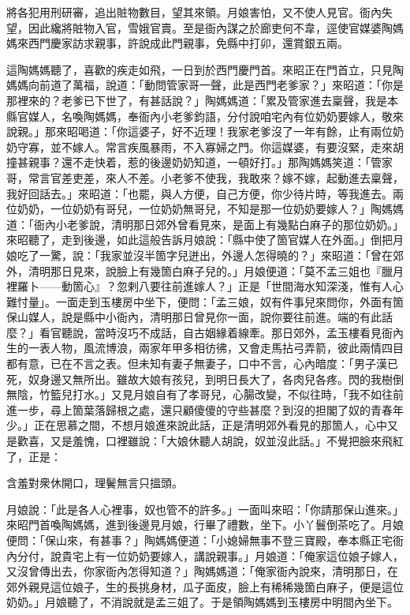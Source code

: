 將各犯用刑研審，追出賍物數目，望其來領。{}月娘害怕，又不使人見官。衙內失望，因此纔將賍物入官，雪娥官賣。至是衙內謀之於廊吏何不韋，逕使官媒婆陶媽媽來西門慶家訪求親事，許說成此門親事，免縣中打卯，還賞銀五兩。

這陶媽媽聽了，喜歡的疾走如飛，一日到於西門慶門首。來昭正在門首立，只見陶媽媽向前道了萬福，說道：「動問管家哥一聲，此是西門老爹家？」來昭道：「你是那裡來的？老爹已下世了，有甚話說？」陶媽媽道：「累及管家進去稟聲，我是本縣官媒人，名喚陶媽媽，奉衙內小老爹鈞語，分付說咱宅內有位奶奶要嫁人，敬來說親。」那來昭喝道：「你這婆子，好不近理！我家老爹沒了一年有餘，止有兩位奶奶守寡，並不嫁人。常言疾風暴雨，不入寡婦之門。你這媒婆，有要沒緊，走來胡撞甚親事？還不走快着，惹的後邊奶奶知道，一頓好打。」那陶媽媽笑道：「管家哥，常言官差吏差，來人不差。小老爹不使我，我敢來？嫁不嫁，起動進去稟聲，我好回話去。」來昭道：「也罷，與人方便，自己方便，你少待片時，等我進去。兩位奶奶，一位奶奶有哥兒，一位奶奶無哥兒，不知是那一位奶奶要嫁人？」陶媽媽道：「衙內小老爹說，清明那日郊外曾看見來，是面上有幾點白麻子的那位奶奶。」來昭聽了，走到後邊，如此這般告訴月娘說：「縣中使了箇官媒人在外面。」倒把月娘吃了一驚，說：「我家並沒半箇字兒迸出，外邊人怎得曉的？」來昭道：「曾在郊外，清明那日見來，說臉上有幾箇白麻子兒的。」月娘便道：「莫不孟三姐也『臘月裡羅卜——動箇心』？忽剌八要往前進嫁人？」正是「世間海水知深淺，惟有人心難忖量」。一面走到玉樓房中坐下，便問：「孟三娘，奴有件事兒來問你，外面有箇保山媒人，說是縣中小衙內，清明那日曾見你一面，說你要往前進。端的有此話麼？」{}看官聽說，當時沒巧不成話，自古姻緣着線牽。那日郊外，孟玉樓看見衙內生的一表人物，風流博浪，兩家年甲多相彷彿，又會走馬拈弓弄箭，彼此兩情四目都有意，已在不言之表。但未知有妻子無妻子，口中不言，心內暗度：「男子漢已死，奴身邊又無所出。雖故大娘有孩兒，到明日長大了，各肉兒各疼。閃的我樹倒無陰，竹籃兒打水。」又見月娘自有了孝哥兒，心腸改變，不似往時，「我不如往前進一步，尋上箇葉落歸根之處，還只顧傻傻的守些甚麼？到沒的担閣了奴的青春年少。」正在思慕之間，不想月娘進來說此話，正是清明郊外看見的那箇人，心中又是歡喜，又是羞愧，口裡雖說：「大娘休聽人胡說，奴並沒此話。」不覺把臉來飛紅了，{}正是：

\begin{myquote}
含羞對衆休開口，理鬢無言只搵頭。
\end{myquote}

月娘說：「此是各人心裡事，奴也管不的許多。」一面叫來昭：「你請那保山進來。」來昭門首喚陶媽媽，進到後邊見月娘，行畢了禮數，坐下。小丫鬟倒茶吃了。月娘便問：「保山來，有甚事？」陶媽媽便道：「小媳婦無事不登三寶殿，奉本縣正宅衙內分付，說貴宅上有一位奶奶要嫁人，講說親事。」月娘道：「俺家這位娘子嫁人，又沒曾傳出去，你家衙內怎得知道？」陶媽媽道：「俺家衙內說來，清明那日，在郊外親見這位娘子，生的長挑身材，瓜子面皮，臉上有稀稀幾箇白麻子，便是這位奶奶。」月娘聽了，不消說就是孟三姐了。于是領陶媽媽到玉樓房中明間內坐下。

